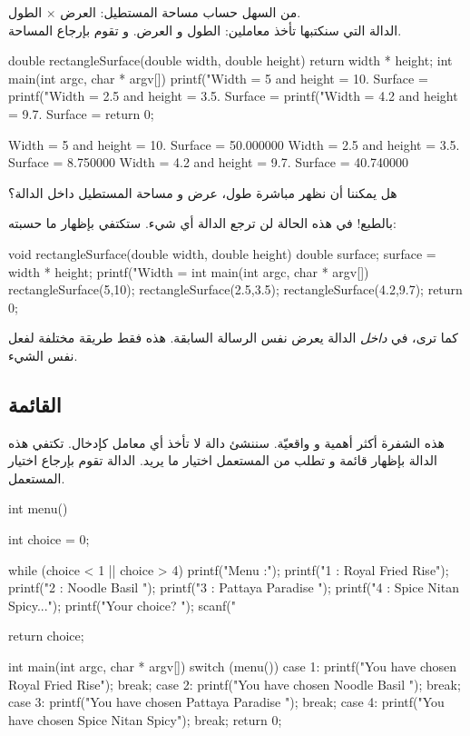 من السهل حساب مساحة المستطيل: العرض $\times$ الطول.\\
الدالة التي سنكتبها
تأخذ معاملين: الطول و العرض. و تقوم بإرجاع المساحة.

\begin{Csource}
double rectangleSurface(double width, double height)
{
	return width * height;
}
int main(int argc, char * argv[])
{
	printf("Width = 5 and height = 10. Surface = %
	printf("Width = 2.5 and height = 3.5. Surface = %
	printf("Width = 4.2 and height = 9.7. Surface = %
	return 0;
}
\end{Csource}

\begin{Console}
Width = 5 and height = 10. Surface = 50.000000
Width = 2.5 and height = 3.5. Surface = 8.750000
Width = 4.2 and height = 9.7. Surface = 40.740000
\end{Console}

\begin{question}
هل يمكننا أن نظهر مباشرة طول، عرض و مساحة المستطيل داخل الدالة؟
\end{question}

بالطبع! في هذه الحالة لن ترجع الدالة أي شيء. ستكتفي بإظهار ما حسبته:

\begin{Csource}
void rectangleSurface(double width, double height)
{
	double surface;
	surface = width * height;
	printf("Width = %
}
int main(int argc, char * argv[])
{
	rectangleSurface(5,10);
	rectangleSurface(2.5,3.5);
	rectangleSurface(4.2,9.7);
	return 0;
}
\end{Csource}

كما ترى، 
في
\textit{داخل}
الدالة
يعرض نفس الرسالة السابقة. هذه فقط طريقة مختلفة لفعل نفس الشيء.

\subsection{القائمة}

هذه الشفرة أكثر أهمية و واقعيّة. سننشئ دالة 
لا تأخذ أي معامل كإدخال. تكتفي هذه الدالة بإظهار قائمة و تطلب من المستعمل اختيار ما يريد. الدالة تقوم بإرجاع اختيار المستعمل.

\begin{Csource}
int menu()
{
	int choice = 0;
	
	while (choice < 1 || choice > 4)
	{
		printf("Menu :\n");
		printf("1 : Royal Fried Rise\n");
		printf("2 : Noodle Basil \n");
		printf("3 : Pattaya Paradise \n");
		printf("4 : Spice Nitan Spicy...\n");
		printf("Your choice? ");
		scanf("%
	}   
	
	return choice;
}
int main(int argc, char * argv[])
{   
	switch (menu())
	{
		case 1:
		printf("You have chosen Royal Fried Rise\n");
		break;
		case 2:
		printf("You have chosen Noodle Basil \n");
		break;
		case 3:
		printf("You have chosen Pattaya Paradise \n");
		break;
		case 4:
		printf("You have chosen Spice Nitan Spicy\n");
		break;   
	}
	return 0;
}
\end{Csource}

